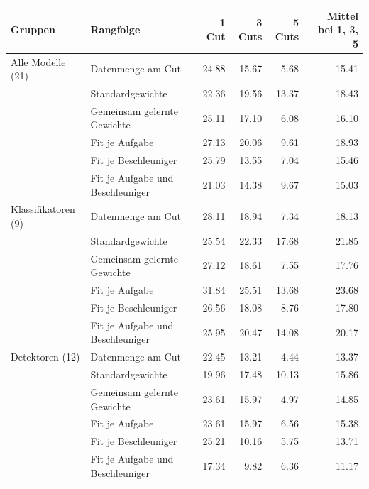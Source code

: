 \begin{tabular}{@{}llrrrr@{}}
\toprule
Gruppen & Rangfolge & 1 Cut & 3 Cuts & 5 Cuts & Mittel bei 1, 3, 5 \\
\midrule
Alle Modelle (21) & Datenmenge am Cut & 24.88 & 15.67 & 5.68 & 15.41 \\
 & Standardgewichte & 22.36 & 19.56 & 13.37 & 18.43 \\
 & Gemeinsam gelernte Gewichte & 25.11 & 17.10 & 6.08 & 16.10 \\
 & Fit je Aufgabe & 27.13 & 20.06 & 9.61 & 18.93 \\
 & Fit je Beschleuniger & 25.79 & 13.55 & 7.04 & 15.46 \\
 & Fit je Aufgabe und Beschleuniger & 21.03 & 14.38 & 9.67 & 15.03 \\
\midrule
Klassifikatoren (9) & Datenmenge am Cut & 28.11 & 18.94 & 7.34 & 18.13 \\
 & Standardgewichte & 25.54 & 22.33 & 17.68 & 21.85 \\
 & Gemeinsam gelernte Gewichte & 27.12 & 18.61 & 7.55 & 17.76 \\
 & Fit je Aufgabe & 31.84 & 25.51 & 13.68 & 23.68 \\
 & Fit je Beschleuniger & 26.56 & 18.08 & 8.76 & 17.80 \\
 & Fit je Aufgabe und Beschleuniger & 25.95 & 20.47 & 14.08 & 20.17 \\
\midrule
Detektoren (12) & Datenmenge am Cut & 22.45 & 13.21 & 4.44 & 13.37 \\
 & Standardgewichte & 19.96 & 17.48 & 10.13 & 15.86 \\
 & Gemeinsam gelernte Gewichte & 23.61 & 15.97 & 4.97 & 14.85 \\
 & Fit je Aufgabe & 23.61 & 15.97 & 6.56 & 15.38 \\
 & Fit je Beschleuniger & 25.21 & 10.16 & 5.75 & 13.71 \\
 & Fit je Aufgabe und Beschleuniger & 17.34 & 9.82 & 6.36 & 11.17 \\
\bottomrule
\end{tabular}
